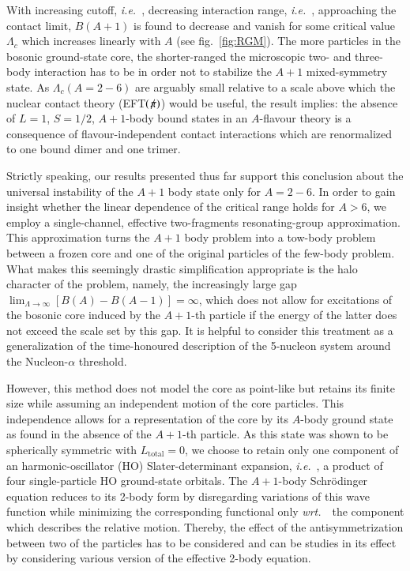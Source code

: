\documentclass[preprint,12pt]{elsarticle}
\newcommand{\wrt}{\textit{wrt.}~}
\newcommand{\ie}{\textit{i.e.}~}
\newcommand{\eftnopi}{\mbox{EFT$(\not \! \pi)$}}
\begin{document}
With increasing cutoff, \ie, decreasing interaction range, \ie, approaching the contact limit, $B(A+1)$ is found to decrease
and vanish for some critical value $\Lambda_c$ which increases linearly with $A$ (see fig.~\ref{fig:RGM}).
The more particles in the bosonic ground-state core, the shorter-ranged the microscopic two- and three-body interaction
has to be in order not to stabilize the $A+1$ mixed-symmetry state.
As $\Lambda_c(A=2-6)$ are arguably small relative to a scale above which the nuclear contact theory (\eftnopi) would
be useful, the result implies: the absence of $L=1$, $S=1/2$, $A+1$-body bound states in an $A$-flavour theory
is a consequence of flavour-independent contact interactions which are renormalized to one bound dimer and one trimer. 

Strictly speaking, our results presented thus far support this conclusion about the universal instability of the $A+1$
body state only for $A=2-6$. In order to gain insight whether the linear dependence of the critical range holds for
$A>6$, we employ a single-channel, effective two-fragments resonating-group approximation. This approximation
turns the $A+1$ body problem into a tow-body problem between a frozen core and one of the original particles of
the few-body problem. What makes this seemingly drastic simplification appropriate is the halo character of the problem,
namely, the increasingly large gap $\lim_{\Lambda\to\infty}\left[B(A)-B(A-1)\right]=\infty$, which does not
allow for excitations of the bosonic core induced by the $A+1$-th particle if the energy of the latter
does not exceed the scale set by this gap. It is helpful to consider this treatment as a generalization of the
time-honoured description of the 5-nucleon system around the Nucleon-$\alpha$ threshold.

However, this method does not model the core as point-like but retains its finite size while assuming
an independent motion of the core particles. This independence allows for a representation of the core by
its $A$-body ground state as found in the absence of the $A+1$-th particle. As this state was shown
to be spherically symmetric with $L_\text{total}=0$, we choose to retain only one component of an harmonic-oscillator (HO)
Slater-determinant expansion, \ie, a product of four single-particle HO ground-state orbitals.
The $A+1$-body Schr\"odinger equation reduces to its 2-body form by disregarding variations of this wave function
while minimizing the corresponding functional only \wrt~the component which describes the relative motion.
Thereby, the effect of the antisymmetrization between two of the particles has to be considered and can be studies
in its effect by considering various version of the effective 2-body equation.
\end{document}
